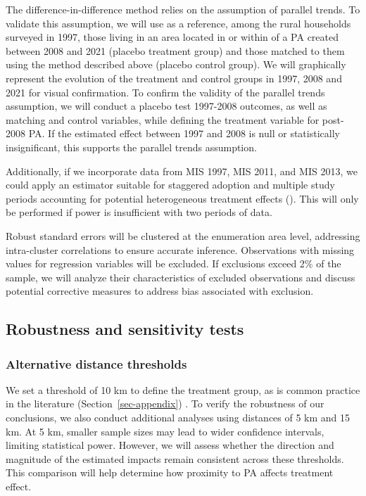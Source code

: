 \documentclass[
]{article}
\begin{document}
The difference-in-difference method relies on the assumption of parallel
trends. To validate this assumption, we will use as a reference, among
the rural households surveyed in 1997, those living in an area located
in or within of a PA created between 2008 and 2021 (placebo treatment
group) and those matched to them using the method described above
(placebo control group). We will graphically represent the evolution of
the treatment and control groups in 1997, 2008 and 2021 for visual
confirmation. To confirm the validity of the parallel trends assumption,
we will conduct a placebo test 1997-2008 outcomes, as well as matching
and control variables, while defining the treatment variable for
post-2008 PA. If the estimated effect between 1997 and 2008 is null or
statistically insignificant, this supports the parallel trends
assumption.

Additionally, if we incorporate data from MIS 1997, MIS 2011, and MIS
2013, we could apply an estimator suitable for staggered adoption and
multiple study periods accounting for potential heterogeneous treatment
effects (). This will only be performed if power is insufficient with two
periods of data.

Robust standard errors will be clustered at the enumeration area level,
addressing intra-cluster correlations to ensure accurate inference.
Observations with missing values for regression variables will be
excluded. If exclusions exceed 2\% of the sample, we will analyze their
characteristics of excluded observations and discuss potential
corrective measures to address bias associated with exclusion.

\subsection{Robustness and sensitivity
tests}\label{robustness-and-sensitivity-tests}

\subsubsection{Alternative distance
thresholds}\label{alternative-distance-thresholds}

We set a threshold of 10 km to define the treatment group, as is common
practice in the literature (Section~\ref{sec-appendix}) . To verify the
robustness of our conclusions, we also conduct additional analyses using
distances of 5 km and 15 km. At 5 km, smaller sample sizes may lead to
wider confidence intervals, limiting statistical power. However, we will
assess whether the direction and magnitude of the estimated impacts
remain consistent across these thresholds. This comparison will help
determine how proximity to PA affects treatment effect.
\end{document}
